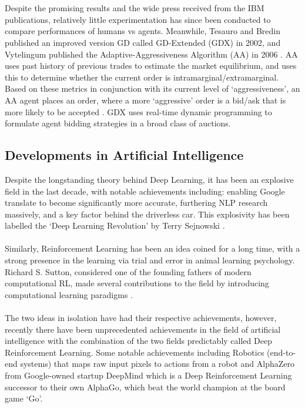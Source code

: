 \documentclass[ %
                    author={Ashwinder Khurana},
                supervisor={Prof Dave Cliff},
                    degree={MEng},
                     title={The Deeply Reinforced Trader},
                  subtitle={},
                      type={enterprise},
                      year={2020} ]{dissertation}
\begin{document}
\\
\\
Despite the promising results and the wide press received from the IBM publications, relatively little experimentation has since been conducted to compare performances of humans vs agents. Meanwhile, Tesauro and Bredin published an improved version GD called GD-Extended (GDX) in 2002, and Vytelingum published the Adaptive-Aggressiveness Algorithm (AA) in 2006 \cite{AA}. AA uses past history of previous trades to estimate the market equilibrium, and uses this to determine whether the current order is intramarginal/extramarginal. Based on these metrics in conjunction with its current level of \enquote*{aggressiveness}, an AA agent places an order, where a more \enquote*{aggressive} order is a bid/ask that is more likely to be accepted \cite{Fintech-lecture}. GDX uses real-time dynamic programming to formulate agent bidding strategies in a broad class of auctions\cite{Fintech-lecture}.

\subsection{Developments in Artificial Intelligence}
\label{section:DevelopmentsAI}
Despite the longstanding theory behind Deep Learning, it has been an explosive field in the last decade, with notable achievements including: enabling Google translate to become significantly more accurate, furthering NLP research massively, and a key factor behind the driverless car. This explosivity has been labelled the \enquote*{Deep Learning Revolution} by Terry Sejnowski \cite{Deep-Learning-Revolution}.
\\
\\
Similarly, Reinforcement Learning has been an idea coined for a long time, with a strong presence in the learning via trial and error in animal learning psychology. Richard S. Sutton, considered one of the founding fathers of modern computational RL, made several contributions to the field by introducing computational learning paradigms \cite{Sutton}.
\\
\\
\noindent
The two ideas in isolation have had their respective achievements, however, recently there have been unprecedented achievements in the field of artificial intelligence with the combination of the two fields predictably called Deep Reinforcement Learning. Some notable achievements including Robotics (end-to-end systems) \cite{deep-learning-robots} that maps raw input pixels to actions from a robot and AlphaZero from Google-owned startup DeepMind which is a Deep Reinforcement Learning successor to their own AlphaGo, which beat the world champion at the board game \enquote*{Go}.
\end{document}
